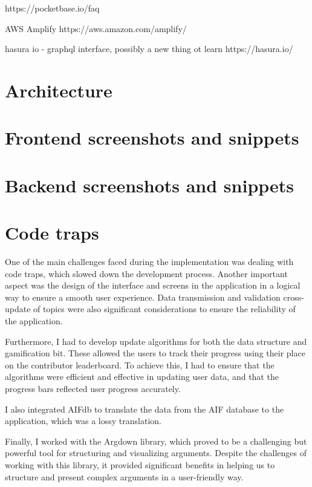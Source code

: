 \documentclass{article}
\begin{document}
https://pocketbase.io/faq

AWS Amplify
https://aws.amazon.com/amplify/

hasura io - graphql interface, possibly a new thing ot learn
https://hasura.io/

\section{Architecture}

\section{Frontend screenshots and snippets}

\section{Backend screenshots and snippets}


\section{Code traps}
One of the main challenges faced during the implementation was dealing with code traps, which slowed down the development process. Another important aspect was the design of the interface and screens in the application in a logical way to ensure a smooth user experience. Data transmission and validation cross-update of topics were also significant considerations to ensure the reliability of the application.

Furthermore, I had to develop update algorithms for both the data structure and gamification bit. These allowed the users to track their progress using their place on the contributor leaderboard. To achieve this, I had to ensure that the algorithms were efficient and effective in updating user data, and that the progress bars reflected user progress accurately.

I also integrated AIFdb to translate the data from the AIF database to the application, which was a lossy translation.

Finally, I worked with the Argdown library, which proved to be a challenging but powerful tool for structuring and visualizing arguments. Despite the challenges of working with this library, it provided significant benefits in helping us to structure and present complex arguments in a user-friendly way.
\end{document}
